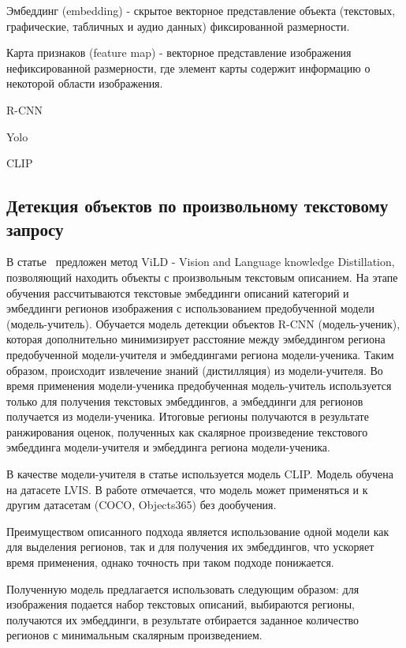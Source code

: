 \documentclass[a4paper,14pt]{article}
\begin{document}
	Эмбеддинг (embedding) - скрытое векторное представление объекта (текстовых, графические, табличных и аудио данных) фиксированной размерности.
	
	Карта признаков (feature map) - векторное представление изображения нефиксированной размерности, где элемент карты содержит информацию о некоторой области изображения.
	
	R-CNN
	
	Yolo
	
	CLIP~\cite{CLIP}
	
	\subsection{Детекция объектов по произвольному текстовому запросу}
	
	В статье~\cite{ViLD} предложен метод ViLD - Vision and Language knowledge Distillation, позволяющий находить объекты с произвольным текстовым описанием. 
	На этапе обучения рассчитываются текстовые эмбеддинги описаний категорий и эмбеддинги регионов изображения с использованием предобученной модели (модель-учитель). 
	Обучается модель детекции объектов R-CNN (модель-ученик), которая дополнительно минимизирует расстояние между эмбеддингом региона предобученной модели-учителя и эмбеддингами региона модели-ученика. 
	Таким образом, происходит извлечение знаний (дистилляция) из модели-учителя. 
	Во время применения модели-ученика предобученная модель-учитель используется только для получения текстовых эмбеддингов, а эмбеддинги для регионов получается из модели-ученика. 
	Итоговые регионы получаются в результате ранжирования оценок, полученных как скалярное произведение текстового эмбеддинга модели-учителя и эмбеддинга региона модели-ученика.
	 
	В качестве модели-учителя в статье используется модель CLIP. 
	Модель обучена на датасете LVIS. В работе отмечается, что модель может применяться и к другим датасетам (COCO, Objects365) без дообучения.
	
	Преимуществом описанного подхода является использование одной модели как для выделения регионов, так и для получения их эмбеддингов, что ускоряет время применения, однако точность при таком подходе понижается.
	
	Полученную модель предлагается использовать следующим образом: для изображения подается набор текстовых описаний, выбираются регионы, получаются их эмбеддинги, в результате отбирается заданное количество регионов с минимальным скалярным произведением. 
	
\end{document}
